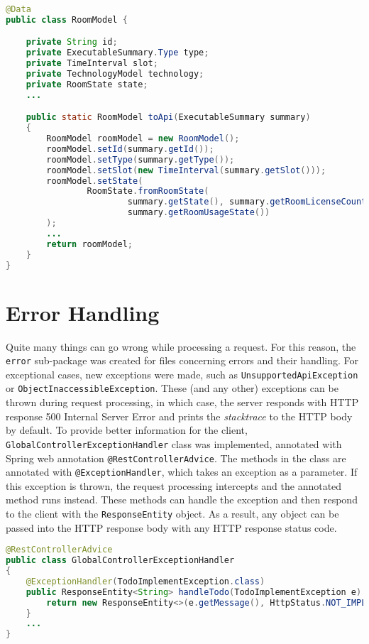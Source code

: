 \begin{lstlisting}[language=java, caption=RoomModel.java, label=lst:model]
@Data
public class RoomModel {

    private String id;
    private ExecutableSummary.Type type;
    private TimeInterval slot;
    private TechnologyModel technology;
    private RoomState state;
    ...

    public static RoomModel toApi(ExecutableSummary summary)
    {
        RoomModel roomModel = new RoomModel();
        roomModel.setId(summary.getId());
        roomModel.setType(summary.getType());
        roomModel.setSlot(new TimeInterval(summary.getSlot()));
        roomModel.setState(
                RoomState.fromRoomState(
                        summary.getState(), summary.getRoomLicenseCount(),
                        summary.getRoomUsageState())
        );
        ...
        return roomModel;
    }
}
\end{lstlisting}


\section{Error Handling}
Quite many things can go wrong while processing a request. For this reason, the \texttt{error} sub-package was created for files concerning errors and their handling.
For exceptional cases, new exceptions were made, such as \texttt{UnsupportedApiException} or \texttt{ObjectInaccessibleException}.
These (and any other) exceptions can be thrown during request processing, in which case, the server responds with HTTP response 500 Internal Server Error and prints the \emph{stacktrace} to the HTTP body by default.
To provide better information for the client, \texttt{GlobalController\-ExceptionHandler} class was implemented, annotated with Spring web annotation \texttt{@RestControllerAdvice}.
The methods in the class are annotated with \texttt{@ExceptionHandler}, which takes an exception as a parameter. If this exception is thrown, the request processing intercepts and the annotated method runs instead.
These methods can handle the exception and then respond to the client with the \texttt{ResponseEntity} object. As a result, any object can be passed into the HTTP response body with any HTTP response status code.

\begin{lstlisting}[language=java, caption=GlobalControllerExceptionHandler.java, label=lst:err]
@RestControllerAdvice
public class GlobalControllerExceptionHandler
{
    @ExceptionHandler(TodoImplementException.class)
    public ResponseEntity<String> handleTodo(TodoImplementException e) {
        return new ResponseEntity<>(e.getMessage(), HttpStatus.NOT_IMPLEMENTED);
    }
    ...
}
\end{lstlisting}

